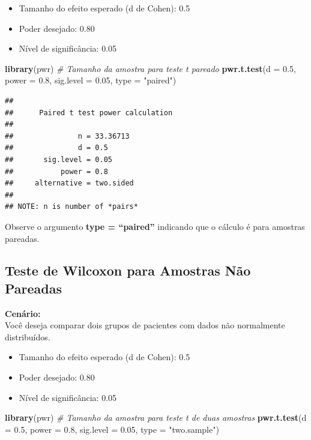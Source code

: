 \documentclass[
]{book}
\newenvironment{Shaded}{\begin{snugshade}}{\end{snugshade}}
\newcommand{\AttributeTok}[1]{\textcolor[rgb]{0.13,0.29,0.53}{#1}}
\newcommand{\CommentTok}[1]{\textcolor[rgb]{0.56,0.35,0.01}{\textit{#1}}}
\newcommand{\FloatTok}[1]{\textcolor[rgb]{0.00,0.00,0.81}{#1}}
\newcommand{\FunctionTok}[1]{\textcolor[rgb]{0.13,0.29,0.53}{\textbf{#1}}}
\newcommand{\NormalTok}[1]{#1}
\newcommand{\StringTok}[1]{\textcolor[rgb]{0.31,0.60,0.02}{#1}}
\providecommand{\tightlist}{%
  \setlength{\itemsep}{0pt}\setlength{\parskip}{0pt}}
\begin{document}
\begin{itemize}
\tightlist
\item
  Tamanho do efeito esperado (d de Cohen): 0.5\\
\item
  Poder desejado: 0.80\\
\item
  Nível de significância: 0.05
\end{itemize}

\begin{Shaded}
\begin{Highlighting}[]
\FunctionTok{library}\NormalTok{(pwr)}
\CommentTok{\# Tamanho da amostra para teste t pareado}
\FunctionTok{pwr.t.test}\NormalTok{(}\AttributeTok{d =} \FloatTok{0.5}\NormalTok{, }\AttributeTok{power =} \FloatTok{0.8}\NormalTok{, }\AttributeTok{sig.level =} \FloatTok{0.05}\NormalTok{, }\AttributeTok{type =} \StringTok{"paired"}\NormalTok{)}
\end{Highlighting}
\end{Shaded}

\begin{verbatim}
## 
##      Paired t test power calculation 
## 
##               n = 33.36713
##               d = 0.5
##       sig.level = 0.05
##           power = 0.8
##     alternative = two.sided
## 
## NOTE: n is number of *pairs*
\end{verbatim}

Observe o argumento \textbf{type = ``paired''} indicando que o cálculo é para amostras pareadas.

\subsection{Teste de Wilcoxon para Amostras Não Pareadas}\label{teste-de-wilcoxon-para-amostras-nuxe3o-pareadas}

\textbf{Cenário:}\\
Você deseja comparar dois grupos de pacientes com dados não normalmente distribuídos.

\begin{itemize}
\tightlist
\item
  Tamanho do efeito esperado (d de Cohen): 0.5\\
\item
  Poder desejado: 0.80\\
\item
  Nível de significância: 0.05
\end{itemize}

\begin{Shaded}
\begin{Highlighting}[]
\FunctionTok{library}\NormalTok{(pwr)}
\CommentTok{\# Tamanho da amostra para teste t de duas amostras}
\FunctionTok{pwr.t.test}\NormalTok{(}\AttributeTok{d =} \FloatTok{0.5}\NormalTok{, }\AttributeTok{power =} \FloatTok{0.8}\NormalTok{, }\AttributeTok{sig.level =} \FloatTok{0.05}\NormalTok{, }\AttributeTok{type =} \StringTok{"two.sample"}\NormalTok{)}
\end{Highlighting}
\end{Shaded}
\end{document}
